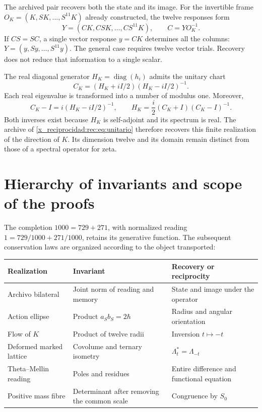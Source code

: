 The archived pair recovers both the state and its image. For the invertible frame \(O_K=(K,SK,\ldots,S^{11}K)\) already constructed, the twelve responses form
\[
 Y=(CK,CSK,\ldots,CS^{11}K),\qquad C=YO_K^{-1}.
\]
If \(CS=SC\), a single vector response \(y=CK\) determines all the columns: \(Y=(y,Sy,\ldots,S^{11}y)\). The general case requires twelve vector trials. Recovery does not reduce that information to a single scalar.

The real diagonal generator \(H_K=\operatorname{diag}(h_i)\) admits the unitary chart
\[
 C_K=(H_K+iI/2)(H_K-iI/2)^{-1}.
\]
Each real eigenvalue is transformed into a number of modulus one. Moreover,
\[
 C_K-I=i(H_K-iI/2)^{-1},\qquad
 H_K=\frac i2(C_K+I)(C_K-I)^{-1}.
\]
Both inverses exist because \(H_K\) is self-adjoint and its spectrum is real. The archive of \eqref{x_reciprocidad:rec:eq:unitario} therefore recovers this finite realization of the direction of \(K\). Its dimension twelve and its domain remain distinct from those of a spectral operator for zeta.

\section{Hierarchy of invariants and scope of the proofs}

The completion \(1000=729+271\), with normalized reading \(1=729/1000+271/1000\), retains its generative function. The subsequent conservation laws are organized according to the object transported:
\begin{center}
\small
\begin{tabularx}{\linewidth}{@{}p{.27\linewidth}Xp{.25\linewidth}@{}}
\toprule
Realization & Invariant & Recovery or reciprocity\\
\midrule
Archivo bilateral & Joint norm of reading and memory & State and image under the operator\\
Action ellipse & Product \(a_Sb_S=2\hbar\) & Radius and angular orientation\\
Flow of \(K\) & Product of twelve radii & Inversion \(t\mapsto-t\)\\
Deformed marked lattice & Covolume and ternary isometry & \(\Lambda_t^*=\Lambda_{-t}\)\\
Theta--Mellin reading & Poles and residues & Entire difference and functional equation\\
Positive mass fibre & Determinant after removing the common scale & Congruence by \(S_0\)\\
\bottomrule
\end{tabularx}
\end{center}

